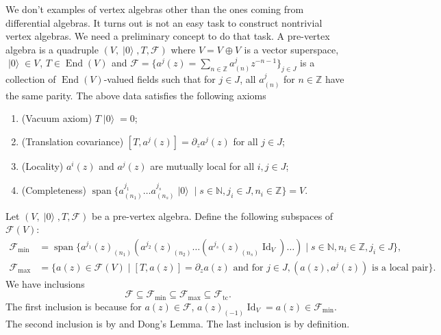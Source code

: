 \documentclass[a4paper, 12pt, reqno]{amsart}
\theoremstyle{remark}
\numberwithin{equation}{subsection}
\DeclareMathOperator{\Id}{Id}
\DeclareMathOperator{\End}{End}
\DeclareMathOperator{\vspan}{span}
\DeclareMathOperator{\vac}{|0\rangle}
\DeclareMathOperator{\zero}{\overline{0}}
\DeclareMathOperator{\one}{\overline{1}}
\DeclareMathOperator{\tc}{tc}
\begin{document}
We don't examples of vertex algebras other than the ones coming from differential algebras.
It turns out is not an easy task to construct nontrivial vertex algebras.
We need a preliminary concept to do that task. 
A pre-vertex algebra is a quadruple $(V, \vac, T, \mathcal{F})$ where $V = V_{\zero} \oplus V_{\one}$ is a vector superspace, $\vac \in V_{\zero}$, $T \in \End(V)_{\zero}$ and $\mathcal{F} = \{a^j(z) = \sum_{n \in \mathbb{Z}}a^j_{(n)}z^{-n - 1}\}_{j \in J}$ is a collection of $\End(V)$-valued fields such that for $j \in J$, all $a^j_{(n)}$ for $n \in \mathbb{Z}$ have the same parity.
The above data satisfies the following axioms
\begin{enumerate}
\item (Vacuum axiom) $T\vac = 0$;
\item (Translation covariance) $[T, a^j(z)] = \partial_za^j(z)$ for all $j \in J$;
\item (Locality) $a^i(z)$ and $a^j(z)$ are mutually local for all $i, j \in J$;
\item (Completeness) $\vspan\{a^{j_1}_{(n_1)}\dots a^{j_s}_{(n_s)}\vac \mid s \in \mathbb{N}, j_i \in J, n_i \in \mathbb{Z}\} = V$.
\end{enumerate}

Let $(V, \vac, T, \mathcal{F})$ be a pre-vertex algebra.
Define the following subspaces of $\mathcal{F}(V)$:
\begin{align*}
  \mathcal{F}_{\min} &= \vspan\{a^{j_1}(z)_{(n_1)}(a^{j_2}(z)_{(n_2)}\dots(a^{j_s}(z)_{(n_s)}\Id_V)\dots) \mid s \in \mathbb{N}, n_i \in \mathbb{Z}, j_i \in J\}, \\
  \mathcal{F}_{\max} &= \{a(z) \in \mathcal{F}(V) \mid [T, a(z)] = \partial_za(z)\text{ and for }j \in J, (a(z),a^j(z))\text{ is a local pair}\}.
\end{align*}
We have inclusions
\begin{equation*}
  \mathcal{F} \subseteq \mathcal{F}_{\min} \subseteq \mathcal{F}_{\max} \subseteq \mathcal{F}_{\tc}.
\end{equation*}
The first inclusion is because for $a(z) \in \mathcal{F}$, $a(z)_{(-1)}\Id_V = a(z) \in \mathcal{F}_{\min}$.
The second inclusion is by  and Dong's Lemma.
The last inclusion is by definition.
\end{document}
